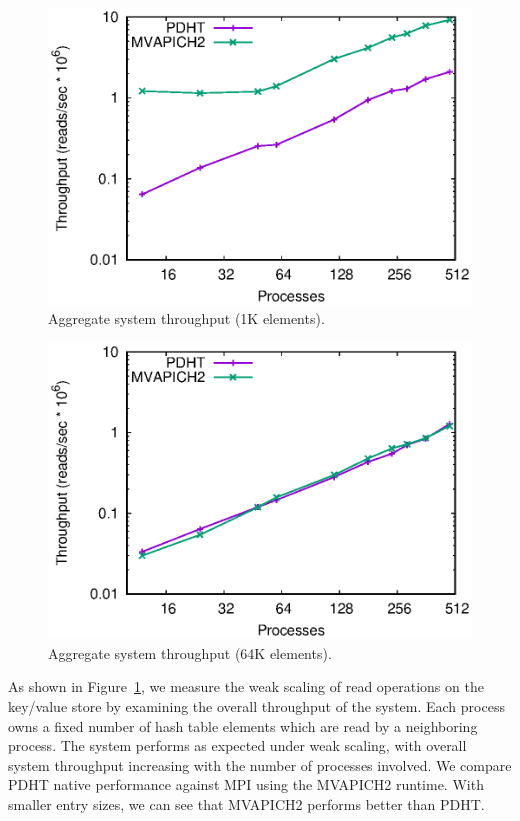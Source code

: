 \begin{figure}
    \centering
    \includegraphics[width=.9\linewidth]{plots/scaling1k}
    \caption{Aggregate system throughput (1K elements).}
    \label{fig:throughput-small}
\end{figure}

\begin{figure}
    \centering
    \includegraphics[width=.9\linewidth]{plots/scaling64}
    \caption{Aggregate system throughput (64K elements).}
    \label{fig:throughput-big}
\end{figure}

As shown in Figure~\ref{fig:throughput-small}, we measure the weak scaling
of \pdht read operations on the key/value store by examining the
overall throughput of the system. Each process owns a fixed number of
hash table elements which are read by a neighboring process. The
system performs as expected under weak scaling, with overall system
throughput increasing with the number of processes involved. We compare
PDHT native performance against MPI using the MVAPICH2 runtime. With smaller
entry sizes, we can see that MVAPICH2 performs better than PDHT. 

